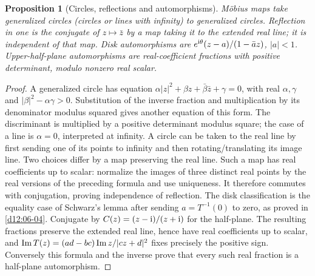 \documentclass[11pt,a4paper,openany]{book}
\newtheorem{proposition}[theorem]{Proposition}
\theoremstyle{definition}
\theoremstyle{remark}\newtheorem{remark}[theorem]{Remark}
\newcommand{\family}[1]{}
\begin{document}
\begin{proposition}[Circles, reflections and automorphisms]\family{D12.10.03}\label{d12:10-03}
M\"obius maps take generalized circles (circles or lines with infinity) to generalized circles. Reflection in one is the conjugate of $z\mapsto\bar z$ by a map taking it to the extended real line; it is independent of that map. Disk automorphisms are
$e^{\mathrm i\theta}(z-a)/(1-\bar a z)$, $|a|<1$. Upper-half-plane automorphisms are real-coefficient fractions with positive determinant, modulo nonzero real scalar.
\end{proposition}
\begin{proof}
A generalized circle has equation $\alpha|z|^2+\beta z+\bar\beta\bar z+\gamma=0$, with real $\alpha,\gamma$ and $|\beta|^2-\alpha\gamma>0$. Substitution of the inverse fraction and multiplication by its denominator modulus squared gives another equation of this form. The discriminant is multiplied by a positive determinant modulus square; the case of a line is $\alpha=0$, interpreted at infinity. A circle can be taken to the real line by first sending one of its points to infinity and then rotating/translating its image line. Two choices differ by a map preserving the real line. Such a map has real coefficients up to scalar: normalize the images of three distinct real points by the real versions of the preceding formula and use uniqueness. It therefore commutes with conjugation, proving independence of reflection.
The disk classification is the equality case of Schwarz's lemma after sending $a=T^{-1}(0)$ to zero, as proved in \cref{d12:06-04}. Conjugate by $C(z)=(z-\mathrm i)/(z+\mathrm i)$ for the half-plane. The resulting fractions preserve the extended real line, hence have real coefficients up to scalar, and
$\operatorname{Im} T(z)=(ad-bc)\operatorname{Im} z/|cz+d|^2$ fixes precisely the positive sign. Conversely this formula and the inverse prove that every such real fraction is a half-plane automorphism.
\end{proof}
\end{document}
